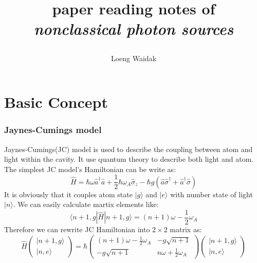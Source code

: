 \documentclass[10pt]{article}
\title{\begin{center}{\Huge paper reading notes of}\\{{\itshape nonclassical photon sources}}\end{center}}
\author{Loeng Waidak}
\affiliation{
    Sun-Yatsen unniversity\\
    School of Physics and Astronomy
}
\newcommand{\h}[1]{\hat{#1}}
\newcommand{\hd}[1]{\hat{#1}^{\dagger}}
\renewcommand{\bra}[1]{\langle #1 |}
\renewcommand{\ket}[1]{| #1 \rangle}
\begin{document}
    \maketitle
    \flushbottom
    \newpage
    \pagestyle{fancynotes}

    \part{Basic Concept}
    \section{Jaynes-Cumings model}
        Jaynes-Cumings(JC) model is used to describe the coupling between atom and light within the cavity.
        It use quantum theory to describe both light and atom.
        The simplest JC model's Hamiltonian can be write as:
        \begin{equation}
            \h{H} = \hbar \omega \hd{a} \h{a} + \frac{1}{2}\hbar \omega_A \h{\sigma}_z - \hbar g (\h{a}\hd{\sigma} + \hd{a}\h{\sigma})
        \end{equation}
        It is obviously that it couples atom state $\ket{g}$ and $\ket{e}$ with number state of light $\ket{n}$.
        We can easily calculate martix elements like:
        \begin{equation}
            \bra{n+1,g} \h{H} \ket{n+1,g} = (n+1)\omega - \frac{1}{2}\omega_A
        \end{equation}
        Therefore we can rewrite JC Hamiltonian into $2\times 2$ matrix as:
        \begin{equation}
            \h{H} \begin{pmatrix}
                \ket{n+1,g} \\ \ket{n,e}
            \end{pmatrix}
            = \hbar \begin{pmatrix}
                (n+1)\omega-\frac{1}{2}\omega_A & -g\sqrt{n+1}\\
                -g\sqrt{n+1} & n\omega + \frac{1}{2}\omega_A
            \end{pmatrix}
            \begin{pmatrix}
                \ket{n+1,g} \\ \ket{n,e}
            \end{pmatrix}
        \end{equation}
\end{document}
